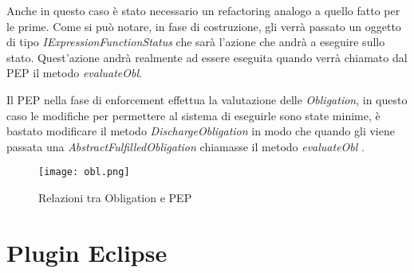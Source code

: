 Anche in questo caso è stato necessario un refactoring analogo a quello fatto per le prime.
Come si può notare, in fase di costruzione, gli verrà passato un oggetto di tipo \textit{IExpressionFunctionStatus} che sarà l'azione che andrà a eseguire sullo stato. Quest'azione andrà realmente ad essere eseguita quando verrà chiamato dal \ac{PEP} il metodo \textit{evaluateObl}. \par
Il \ac{PEP} nella fase di enforcement effettua la valutazione delle \textit{Obligation}, in questo caso le modifiche per permettere al sistema di eseguirle sono state minime, è bastato modificare il metodo \textit{DischargeObligation} in modo che quando gli viene passata una \textit{AbstractFulfilledObligation} chiamasse il metodo \textit{evaluateObl} .
\begin{sidewaysfigure}[H]
    \centering
	\texttt{[image: obl.png]}
    \caption{Relazioni tra Obligation e PEP}
    \label{fig:obl.png}
\end{sidewaysfigure}




\section{Plugin Eclipse}
\label{sec:plugin_eclipse}

